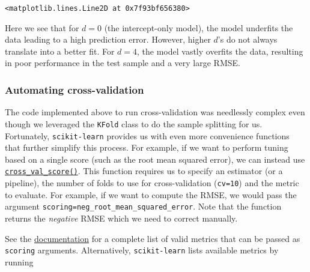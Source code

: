 \documentclass{scrartcl}
\makeatletter
\newcommand{\boxspacing}{\kern\kvtcb@left@rule\kern\kvtcb@boxsep}
\newcommand{\prompt}[4]{
        {\ttfamily\llap{{\color{#2}[#3]:\hspace{3pt}#4}}\vspace{-\baselineskip}}
    }
\makeatother
\begin{document}
            \begin{tcolorbox}[breakable, size=fbox, boxrule=.5pt, pad at break*=1mm, opacityfill=0]
\prompt{Out}{outcolor}{30}{\boxspacing}
\begin{Verbatim}[commandchars=\\\{\}]
<matplotlib.lines.Line2D at 0x7f93bf656380>
\end{Verbatim}
\end{tcolorbox}
        
    \begin{center}
    \end{center}
    
    Here we see that for \(d=0\) (the intercept-only model), the model
underfits the data leading to a high prediction error. However, higher
\(d\)'s do not always translate into a better fit. For \(d = 4\), the
model vastly overfits the data, resulting in poor performance in the
test sample and a very large RMSE.

    \hypertarget{automating-cross-validation}{%
\subsubsection*{Automating
cross-validation}\label{automating-cross-validation}}

The code implemented above to run cross-validation was needlessly
complex even though we leveraged the \texttt{KFold} class to do the
sample splitting for us. Fortunately, \texttt{scikit-learn} provides us
with even more convenience functions that further simplify this process.
For example, if we want to perform tuning based on a single score (such
as the root mean squared error), we can instead use
\href{https://scikit-learn.org/stable/modules/generated/sklearn.model_selection.cross_val_score.html}{\texttt{cross\_val\_score()}}.
This function requires us to specify an estimator (or a pipeline), the
number of folds to use for cross-validation (\texttt{cv=10}) and the
metric to evaluate. For example, if we want to compute the RMSE, we
would pass the argument
\texttt{scoring=\textquotesingle{}neg\_root\_mean\_squared\_error\textquotesingle{}}.
Note that the function returns the \emph{negative} RMSE which we need to
correct manually.

See the
\href{https://scikit-learn.org/stable/modules/model_evaluation.html\#scoring-parameter}{documentation}
for a complete list of valid metrics that can be passed as
\texttt{scoring} arguments. Alternatively, \texttt{scikit-learn} lists
available metrics by running
\end{document}
